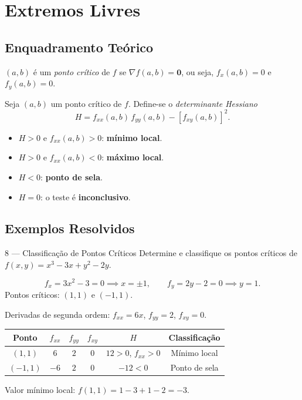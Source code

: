 \section{Extremos Livres}

\subsection{Enquadramento Teórico}

\begin{defbox}[title={Ponto Crítico}]
  $(a,b)$ é um \emph{ponto crítico} de $f$ se $\nabla f(a,b)=\mathbf{0}$,
  ou seja, $f_x(a,b)=0$ e $f_y(a,b)=0$.
\end{defbox}

\begin{thmbox}[title={Teste da Segunda Derivada (Critério de Classificação)}]
  Seja $(a,b)$ um ponto crítico de $f$. Define-se o \emph{determinante Hessiano}
  \[
    H = f_{xx}(a,b)\,f_{yy}(a,b) - [f_{xy}(a,b)]^2.
  \]
  \begin{itemize}
    \item $H > 0$ e $f_{xx}(a,b)>0$: \textbf{mínimo local}.
    \item $H > 0$ e $f_{xx}(a,b)<0$: \textbf{máximo local}.
    \item $H < 0$: \textbf{ponto de sela}.
    \item $H = 0$: o teste é \textbf{inconclusivo}.
  \end{itemize}
\end{thmbox}

\subsection{Exemplos Resolvidos}

\begin{exbox}{8 --- Classificação de Pontos Críticos}
  Determine e classifique os pontos críticos de $f(x,y)=x^3-3x+y^2-2y$.
\end{exbox}
\begin{solbox}
  \[
    f_x = 3x^2-3 = 0 \implies x=\pm 1,\qquad
    f_y = 2y-2 = 0 \implies y = 1.
  \]
  Pontos críticos: $(1,1)$ e $(-1,1)$.

  Derivadas de segunda ordem: $f_{xx}=6x$, $f_{yy}=2$, $f_{xy}=0$.

  \begin{center}
  \renewcommand{\arraystretch}{1.3}
  \begin{tabular}{cccccc}
    \toprule
    Ponto & $f_{xx}$ & $f_{yy}$ & $f_{xy}$ & $H$ & Classificação \\
    \midrule
    $(1,1)$  & $6$  & $2$ & $0$ & $12>0$, $f_{xx}>0$ & Mínimo local \\
    $(-1,1)$ & $-6$ & $2$ & $0$ & $-12<0$ & Ponto de sela \\
    \bottomrule
  \end{tabular}
  \end{center}

  Valor mínimo local: $f(1,1) = 1-3+1-2 = -3$.
\end{solbox}

